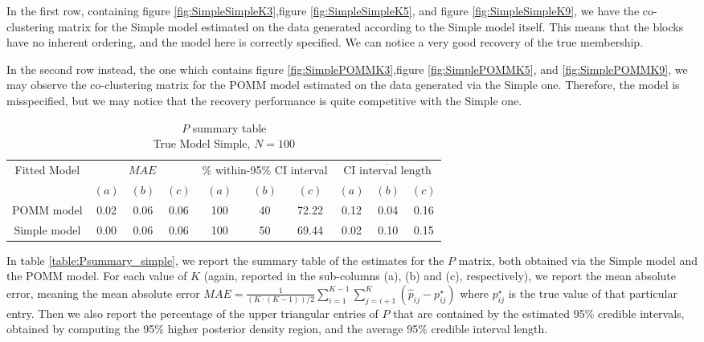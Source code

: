 \documentclass[11pt]{amsart}
\begin{document}
In the first row, containing figure \ref{fig:SimpleSimpleK3},figure \ref{fig:SimpleSimpleK5}, and figure \ref{fig:SimpleSimpleK9}, we have the co-clustering matrix for the Simple model estimated on the data generated according to the Simple model itself. This means that the blocks have no inherent ordering, and the model here is correctly specified. We can notice a very good recovery of the true membership.

In the second row instead, the one which contains figure \ref{fig:SimplePOMMK3},figure \ref{fig:SimplePOMMK5}, and \ref{fig:SimplePOMMK9}, we may observe the co-clustering matrix for the POMM model estimated on the data generated via the Simple one. Therefore, the model is misspecified, but we may notice that the recovery performance is quite competitive with the Simple one.



\begin{table}[htbp]
\centering
\caption{
{\large $P$ summary table} \\ 
{\small True Model Simple, $N=100$}
} 
\begin{tabular}{cccccccccc}
\toprule
\multirow{2}{*}{Fitted Model} & \multicolumn{3}{c}{
$MAE$ } & \multicolumn{3}{c}{
$\%$ within-95\% CI interval} & \multicolumn{3}{c}{ $\overline{\text{CI interval length}}$} \\
\cmidrule(lr){2-4} \cmidrule(lr){5-7} \cmidrule(lr){8-10}
& $(a)$ & $(b)$ & $(c)$ & $(a)$ & $(b)$ & $(c)$ & $(a)$ & $(b)$ & $(c)$ \\
\midrule
POMM model  &0.02 & 0.06 & 0.06 & 100 & 40 & 72.22 & 0.12 & 0.04 & 0.16 \\
Simple model & 0.00 & 0.06 & 0.06 & 100 & 50 & 69.44 & 0.02 & 0.10 & 0.15 \\
\bottomrule
\end{tabular}
\label{table:Psummary_simple}
\end{table}

In table \eqref{table:Psummary_simple}, we report the summary table of the estimates for the $P$ matrix, both obtained via the Simple model and the POMM model. For each value of $K$ (again, reported in the sub-columns (a), (b) and (c), respectively), we report the mean absolute error, meaning the mean absolute error $MAE = \frac{1}{(K\cdot(K-1))/2} \sum_{i=1}^{K-1}\sum_{j=i+1}^K \left(\hat{p}_{ij} - p^\star_{ij}\right)$ where $p^\star_{ij}$ is the true value of that particular entry. Then we also report the percentage of the upper triangular entries of $P$ that are contained by the estimated 95\% credible intervals, obtained by computing the 95\% higher posterior density region, and the average 95\% credible interval length. 
\end{document}
